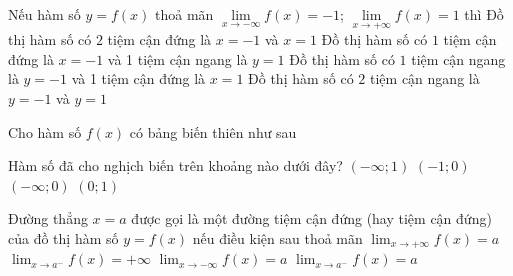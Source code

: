 \begin{ex}%
Nếu hàm số $y = f(x)$ thoả mãn $\lim\limits_{x \to -\infty} f(x) = -1$; $\lim\limits_{x \to +\infty} f(x) = 1$ thì
\choice
{Đồ thị hàm số có $2$ tiệm cận đứng là $x = -1$ và $x = 1$}
{Đồ thị hàm số có $1$ tiệm cận đứng là $x = -1$ và 1 tiệm cận ngang là $y = 1$}
{Đồ thị hàm số có $1$ tiệm cận ngang là $y = -1$ và 1 tiệm cận đứng là $x = 1$}
{\True Đồ thị hàm số có $2$ tiệm cận ngang là $y = -1$ và $y = 1$}
\end{ex}

\begin{ex}%
Cho hàm số $f(x)$ có bảng biến thiên như sau
\begin{center}
\end{center}
Hàm số đã cho nghịch biến trên khoảng nào dưới đây?
\choice
{$(-\infty;1)$}
{\True $(-1;0)$}
{$(-\infty;0)$}
{$(0;1)$}
\end{ex}

\begin{ex}%
Đường thẳng $x = a$ được gọi là một đường tiệm cận đứng (hay tiệm cận đứng) của
đồ thị hàm số $ y = f (x)$ nếu điều kiện sau thoả mãn
\choice
{$\displaystyle\lim_{x\to +\infty }f(x)=a$}
{\True $\displaystyle\lim_{x\to a^-}f(x)=+\infty $}
{$\displaystyle\lim_{x\to -\infty }f(x)=a$}
{$\displaystyle\lim_{x\to a^-}f(x)=a $}
\end{ex}

